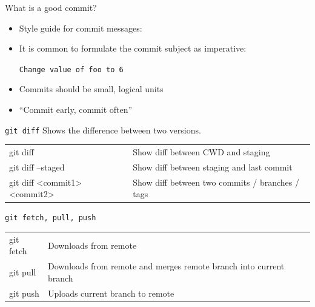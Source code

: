 \begin{frame}[fragile]{What is a good commit?}
  \begin{itemize}
    \item Style guide for commit messages:
    \item It is common to formulate the commit subject as imperative:\\
      \begin{center}
        \texttt{Change value of foo to 6}
      \end{center}
    \item Commits should be small, logical units
    \item \enquote{Commit early, commit often}
  \end{itemize}
\end{frame}

\begin{frame}{\texttt{git diff}}
  Shows the difference between two versions.

  \begin{tabu}{>{\ttfamily}l X[,L]}
    git diff                     & Show diff between CWD and staging\\
    git diff --staged            & Show diff between staging and last commit \\
    git diff <commit1> <commit2> & Show diff between two commits / branches / tags
  \end{tabu}
\end{frame}

\begin{frame}[fragile]{\texttt{git fetch, pull, push}}
  \begin{tabu}{>{\ttfamily}l X[,L]}
    git fetch  & Downloads from remote \\
    git pull   & Downloads from remote and merges remote branch into current branch\\
    git push   & Uploads current branch to remote
  \end{tabu}
\end{frame}

